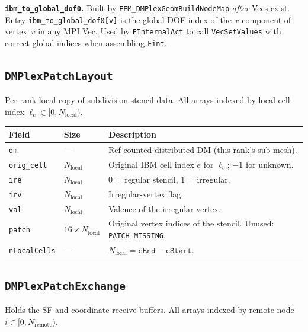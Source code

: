 \documentclass[11pt]{article}
\begin{document}
\textbf{\texttt{ibm\_to\_global\_dof0}.}
Built by \texttt{FEM\_DMPlexGeomBuildNodeMap} \emph{after} Vecs exist.  Entry
\texttt{ibm\_to\_global\_dof0[v]} is the global DOF index of the $x$-component
of vertex~$v$ in any MPI Vec.  Used by \texttt{FInternalAct} to call
\texttt{VecSetValues} with correct global indices when assembling \texttt{Fint}.

\subsection{\texttt{DMPlexPatchLayout}}
\label{sec:layout}

Per-rank local copy of subdivision stencil data.  All arrays indexed by
local cell index $\ell_c \in [0, N_\text{local})$.

\begin{center}
\begin{tabular}{lll}
\toprule
Field & Size & Description \\
\midrule
\texttt{dm}        & ---                        & Ref-counted distributed DM (this rank's sub-mesh). \\
\texttt{orig\_cell}& $N_\text{local}$           & Original IBM cell index $e$ for $\ell_c$; $-1$ for unknown. \\
\texttt{ire}       & $N_\text{local}$           & 0 = regular stencil, 1 = irregular. \\
\texttt{irv}       & $N_\text{local}$           & Irregular-vertex flag. \\
\texttt{val}       & $N_\text{local}$           & Valence of the irregular vertex. \\
\texttt{patch}     & $16 \times N_\text{local}$ & Original vertex indices of the stencil. Unused: \texttt{PATCH\_MISSING}. \\
\texttt{nLocalCells}  & ---                     & $N_\text{local} = \texttt{cEnd} - \texttt{cStart}$. \\
\bottomrule
\end{tabular}
\end{center}

\subsection{\texttt{DMPlexPatchExchange}}
\label{sec:exchange_struct}

Holds the SF and coordinate receive buffers.  All arrays indexed by remote node $i
\in [0, N_\text{remote})$.
\end{document}
